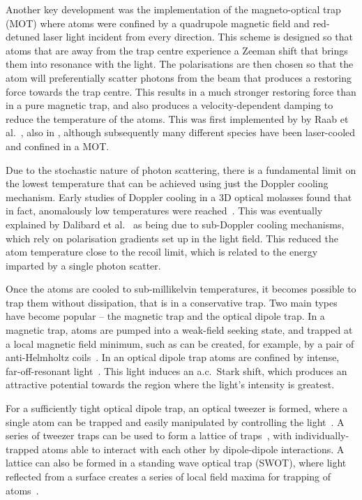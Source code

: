 Another key development was the implementation of the magneto-optical trap
(MOT) where atoms were confined by a quadrupole magnetic field and red-detuned
laser light incident from every direction. This scheme is designed so that
atoms that are away from the trap centre experience a Zeeman shift that brings
them into resonance with the light. The polarisations are then chosen so that
the atom will preferentially scatter photons from the beam that produces a
restoring force towards the trap centre. This results in a much stronger
restoring force than in a pure magnetic trap, and also produces a
velocity-dependent damping to reduce the temperature of the atoms. This was
first implemented by by Raab et al.~\cite{PhysRevLett.59.2631}, also in \Na{},
although subsequently many different species have been laser-cooled and
confined in a MOT.

Due to the stochastic nature of photon scattering, there is a fundamental limit
on the lowest temperature that can be achieved using just the Doppler cooling 
mechanism.  Early studies of Doppler cooling in a 3D optical molasses
found that in fact, anomalously low temperatures
were reached~\cite{Lett1988}. This was eventually explained by
Dalibard et al.~\cite{Dalibard:89} as being due to sub-Doppler cooling
mechanisms, which rely on polarisation gradients set up in the light field.
This reduced the atom temperature close to the recoil limit, which is
related to the energy imparted by a single photon scatter.

Once the atoms are cooled to sub-millikelvin temperatures, it becomes possible
to trap them without dissipation, that is in a conservative trap. Two main
types have become popular -- the magnetic trap and the optical dipole trap. In
a magnetic trap, atoms are pumped into a weak-field seeking state, and trapped
at a local magnetic field minimum, such as can be created, for example, by a
pair of anti-Helmholtz coils~\cite{PhysRevLett.54.2596}. In an optical dipole
trap atoms are confined by intense, far-off-resonant light~\cite{Chu1986}. This
light induces an a.c.\ Stark shift, which produces an attractive potential
towards the region where the light's intensity is greatest.

For a sufficiently tight optical dipole trap, an optical tweezer is formed,
where a single atom can be trapped and easily manipulated by controlling the
light~\cite{Schlosser2001}. A series of tweezer traps can be used to form a
lattice of traps~\cite{Schlosser2001}, with individually-trapped atoms able to
interact with each other by dipole-dipole interactions. A lattice can also be
formed in a standing wave optical trap (SWOT), where light reflected from a
surface creates a series of local field maxima for trapping of
atoms~\cite{Wu2017}.

